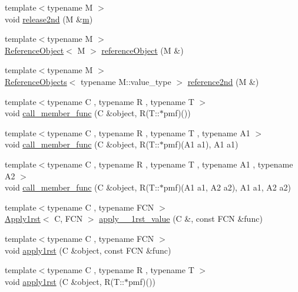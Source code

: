 \begin{DoxyCompactItemize}
{\footnotesize template$<$typename M $>$ }\\void \hyperlink{namespace_d_d4hep_a5af94cb0280d674c7aaca30de20011bb}{release2nd} (M \&\hyperlink{_volumes_8cpp_a6fc379aaec47ce424b00d8ffda2a6c59}{m})
\item 
{\footnotesize template$<$typename M $>$ }\\\hyperlink{class_d_d4hep_1_1_reference_object}{Reference\+Object}$<$ M $>$ \hyperlink{namespace_d_d4hep_aab84633731b55f6c8d2dc7f01ccf82b4}{reference\+Object} (M \&)
\item 
{\footnotesize template$<$typename M $>$ }\\\hyperlink{class_d_d4hep_1_1_reference_objects}{Reference\+Objects}$<$ typename M\+::value\+\_\+type $>$ \hyperlink{namespace_d_d4hep_a807f6ff44b17f4094a962fa879248085}{reference2nd} (M \&)
\item 
{\footnotesize template$<$typename C , typename R , typename T $>$ }\\void \hyperlink{namespace_d_d4hep_ac43b4e908a07dd4d419396751191c52c}{call\+\_\+member\+\_\+func} (C \&object, R(T\+::$\ast$pmf)())
\item 
{\footnotesize template$<$typename C , typename R , typename T , typename A1 $>$ }\\void \hyperlink{namespace_d_d4hep_af85c917bc78ceb8bd162191e686578b2}{call\+\_\+member\+\_\+func} (C \&object, R(T\+::$\ast$pmf)(A1 a1), A1 a1)
\item 
{\footnotesize template$<$typename C , typename R , typename T , typename A1 , typename A2 $>$ }\\void \hyperlink{namespace_d_d4hep_a123cb5c06581e94fe514c2da52cd79d6}{call\+\_\+member\+\_\+func} (C \&object, R(T\+::$\ast$pmf)(A1 a1, A2 a2), A1 a1, A2 a2)
\item 
{\footnotesize template$<$typename C , typename F\+CN $>$ }\\\hyperlink{class_d_d4hep_1_1_apply1rst}{Apply1rst}$<$ C, F\+CN $>$ \hyperlink{namespace_d_d4hep_a75dc945aea0045c5f5c9ce4315b77d3b}{apply\+\_\+\+\_\+1rst\+\_\+value} (C \&, const F\+CN \&func)
\item 
{\footnotesize template$<$typename C , typename F\+CN $>$ }\\void \hyperlink{namespace_d_d4hep_aab8df72602001832a3e4105705b0eb66}{apply1rst} (C \&object, const F\+CN \&func)
\item 
{\footnotesize template$<$typename C , typename R , typename T $>$ }\\void \hyperlink{namespace_d_d4hep_a75d29652b2ebf470d395c581d50ed63c}{apply1rst} (C \&object, R(T\+::$\ast$pmf)())

\end{DoxyCompactItemize}
